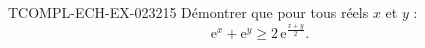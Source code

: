 \begin{exercice}{TCOMPL-ECH-EX-023}{2}{15}
Démontrer que pour tous réels $x$ et $y$ :
\[ \mathrm{e}^x + \mathrm{e}^y \geq 2\,\mathrm{e}^{\frac{x+y}{2}}. \]

\end{exercice}
